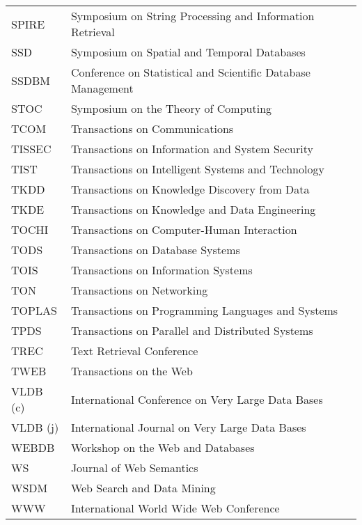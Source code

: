 \begin{table}[h]
\begin{tabular}{ll}
SPIRE					&		Symposium on String Processing and Information Retrieval  \\ 
SSD					&		Symposium on Spatial and Temporal Databases  \\ 
SSDBM					&		Conference on Statistical and Scientific Database Management  \\ 
STOC					&		Symposium on the Theory of Computing  \\ 
TCOM					&		Transactions on Communications  \\ 
TISSEC					&		Transactions on Information and System Security  \\ 
TIST					&		Transactions on Intelligent Systems and Technology  \\ 
TKDD					&		Transactions on Knowledge Discovery from Data  \\ 
TKDE					&		Transactions on Knowledge and Data Engineering  \\ 
TOCHI					&		Transactions on Computer-Human Interaction  \\ 
TODS					&		Transactions on Database Systems  \\ 
TOIS					&		Transactions on Information Systems  \\ 
TON					&		Transactions on Networking  \\ 
TOPLAS					&		Transactions on Programming Languages and Systems  \\ 
TPDS					&		Transactions on Parallel and Distributed Systems  \\ 
TREC					&		Text Retrieval Conference  \\ 
TWEB					&		Transactions on the Web  \\ 
VLDB (c)					&		International Conference on Very Large Data Bases  \\ 
VLDB (j)					&		International Journal on Very Large Data Bases  \\ 
WEBDB					&		Workshop on the Web and Databases  \\ 
WS					&		Journal of Web Semantics  \\ 
WSDM					&		Web Search and Data Mining  \\ 
WWW					&		International World Wide Web Conference  \\ 
\bottomrule
\end{tabular}
\end{table}













